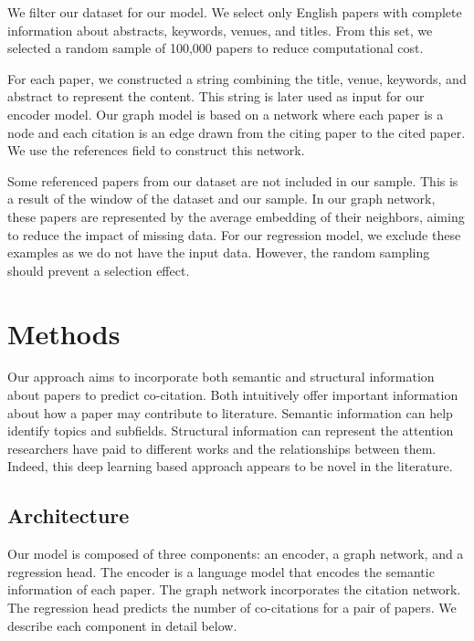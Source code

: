 \documentclass[10pt,twocolumn,letterpaper]{article}
\begin{document}
We filter our dataset for our model. We select only English papers with complete information about abstracts, keywords, venues, and titles. From this set, we selected a random sample of 100,000 papers to reduce computational cost.

For each paper, we constructed a string combining the title, venue, keywords, and abstract to represent the content. This string is later used as input for our encoder model. Our graph model is based on a network where each paper is a node and each citation is an edge drawn from the citing paper to the cited paper. We use the references field to construct this network. 

Some referenced papers from our dataset are not included in our sample. This is a result of the window of the dataset and our sample.
In our graph network, these papers are represented by the average embedding of their neighbors, aiming to reduce the impact of missing data. 
For our regression model, we exclude these examples as we do not have the input data.
However, the random sampling should prevent a selection effect.

\section{Methods}


Our approach aims to incorporate both semantic and structural information about papers to predict co-citation. Both intuitively offer important information about how a paper may contribute to literature. Semantic information can help identify topics and subfields. Structural information can represent the attention researchers have paid to different works and the relationships between them. Indeed, this deep learning based approach appears to be novel in the literature. 

\subsection{Architecture}

Our model is composed of three components: an encoder, a graph network, and a regression head. 
The encoder is a language model that encodes the semantic information of each paper. The graph network incorporates the citation network. The regression head predicts the number of co-citations for a pair of papers. We describe each component in detail below.
\end{document}
